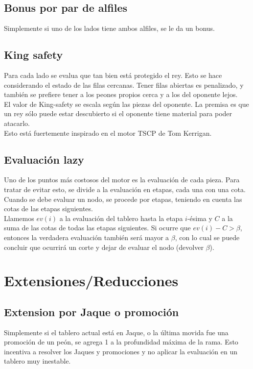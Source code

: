 \documentclass{article}
\begin{document}
\begin{multicols}{2}
\subsection{Bonus por par de alfiles}
Simplemente si uno de los lados tiene ambos alfiles, se le da un bonus.

\subsection{King safety}
Para cada lado se evalua que tan bien está protegido el rey. Esto se
hace considerando el estado de las filas cercanas. Tener filas abiertas
es penalizado, y también se prefiere tener a los peones propios cerca y
a los del oponente lejos.
\\

El valor de King-safety se escala según las piezas del oponente. La
premisa es que un rey sólo puede estar descubierto si el oponente tiene
material para poder atacarlo.
\\

Esto está fuertemente inspirado en el motor TSCP\cite{tscp} de Tom
Kerrigan.

\subsection{Evaluación lazy}

Uno de los puntos más costosos del motor es la evaluación de cada
pieza. Para tratar de evitar esto, se divide a la evaluación en
etapas\cite{lazy-eval}, cada una con una cota. Cuando se debe evaluar un
nodo, se procede por etapas, teniendo en cuenta las cotas de las etapas
siguientes.
\\

Llamemos $ev(i)$ a la evaluación del tablero hasta la etapa $i$-ésima
y $C$ a la suma de las cotas de todas las etapas siguientes. Si ocurre
que $ev(i) - C > \beta$, entonces la verdadera evaluación también
será mayor a $\beta$, con lo cual se puede concluir que ocurrirá un
corte y dejar de evaluar el nodo (devolver $\beta$).

\section{Extensiones/Reducciones}

\subsection{Extension por Jaque o promoción}
Simplemente si el tablero actual está en Jaque, o la última movida fue
una promoción de un peón, se agrega 1 a la profundidad máxima de la
rama. Esto incentiva a resolver los Jaques y promociones y no aplicar la
evaluación en un tablero muy inestable.


\end{multicols}
\end{document}
